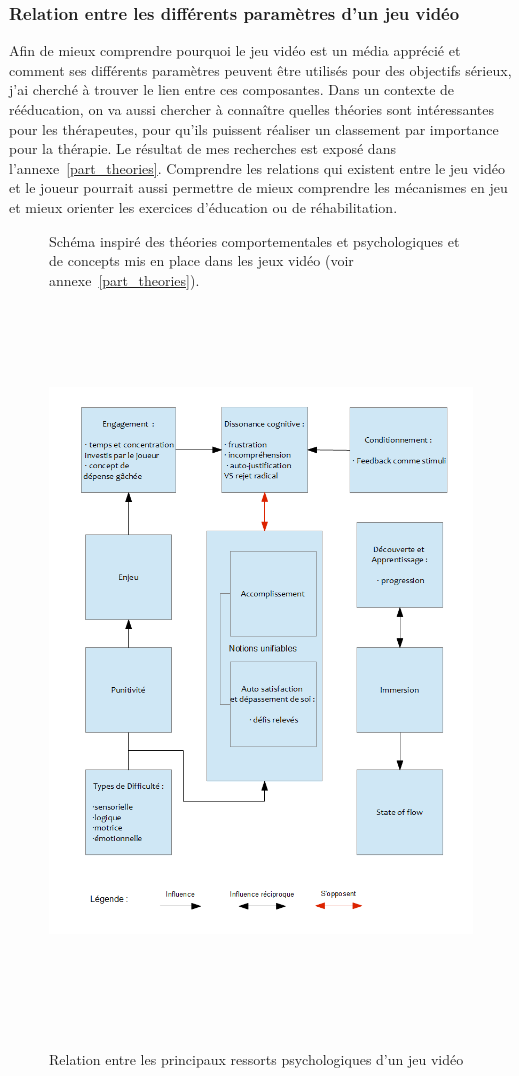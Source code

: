	\subsubsection*{Relation entre les différents paramètres d'un jeu vidéo}
Afin de mieux comprendre pourquoi le jeu vidéo est un média apprécié et comment ses différents paramètres peuvent être utilisés pour des objectifs sérieux, j'ai cherché à trouver le lien entre ces composantes. Dans un contexte de rééducation, on va aussi chercher à connaître quelles théories sont intéressantes pour les thérapeutes, pour qu'ils puissent réaliser un classement par importance pour la thérapie. Le résultat de mes recherches est exposé dans l'annexe~\ref{part_theories}. Comprendre les relations qui existent entre le jeu vidéo et le joueur pourrait aussi permettre de mieux comprendre les mécanismes en jeu et mieux orienter les exercices d'éducation ou de réhabilitation.
\begin{figure}[htbp]
Schéma inspiré des théories comportementales et psychologiques et de concepts mis en place dans les jeux vidéo (voir annexe~\ref{part_theories}).
	\centering
	\includegraphics[height=19.6cm]{images/lien_theories}
	\caption{Relation entre les principaux ressorts psychologiques d'un jeu vidéo}
	\label{lien_theories}
\end{figure}			
